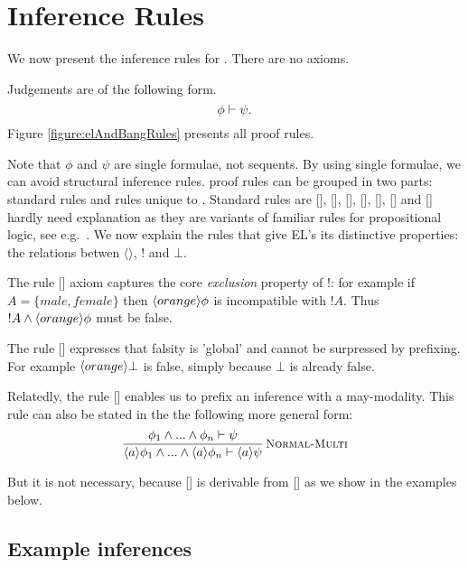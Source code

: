 \section{Inference Rules}



\NI We now present the inference rules for \ELFULL{}. There are no
axioms.

\begin{definition} Judgements are of the following form.
\[
  \phi \vdash \psi.
\]
Figure \ref{figure:elAndBangRules} presents all proof rules. 
\end{definition}

\NI Note that $\phi$ and $\psi$ are single formulae, not sequents.  By
using single formulae, we can avoid structural inference rules.  \ELABR{}
proof rules can be grouped in two parts: standard rules and rules
unique to \ELABR{}.  Standard rules are [],
[], [],
[], [],
[] and [] hardly need
explanation as they are variants of familiar rules for propositional
logic, see e.g.~\cite{TroelstraAS:basprot,vanDalenD:logstr}.  We now
explain the rules that give EL's its distinctive properties: the
relations betwen $\langle \rangle$, $!$ and $\bot$.

The rule [] axiom captures the core
\emph{exclusion} property of !: for example if $A = \{male, female\}$
then $\langle orange \rangle \phi$ is incompatible with $!A$. Thus $!A \land
\langle orange \rangle \phi$ must be false.

The rule [] expresses that falsity is 'global'
  and cannot be surpressed by prefixing. For example
  $\langle orange \rangle \bot$ is false, simply because $\bot$ is already
  false.

Relatedly, the rule [] enables us to
prefix an inference with a may-modality. 
This rule can also be stated in the the following more general
form:
\[
   \frac{\displaystyle{ 
     \phi_1\land...\land\phi_n \vdash\psi
    }}{\displaystyle{ 
     \langle a \rangle \phi_1\land...\land\langle a \rangle \phi_n \vdash\langle a \rangle \psi
    }}\,\textsc{\small Normal-Multi}
\]

\NI But it is not necessary, because [] is
derivable from [] as we show in the examples below.

\subsection{Example inferences}

